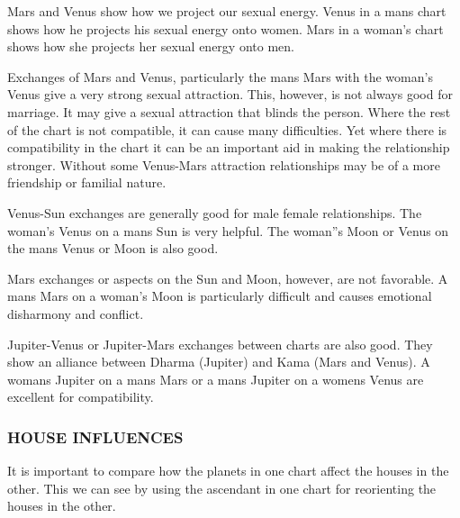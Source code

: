  


 

Mars and Venus show how we project our sexual energy. Venus in a mans chart shows how he projects his sexual energy onto women. Mars in a woman’s chart shows how she projects her sexual energy onto men.

 

Exchanges of Mars and Venus, particularly the mans Mars with the woman’s Venus give a very strong sexual attraction. This, however, is not always good for marriage. It may give a sexual attraction that blinds the person. Where the rest of the chart is not compatible, it can cause many difficulties. Yet where there is compatibility in the chart it can be an important aid in making the relationship stronger. Without some Venus-Mars attraction relationships may be of a more friendship or familial nature.

 



Venus-Sun exchanges are generally good for male female relationships. The woman’s Venus on a mans Sun is very helpful. The woman”s Moon or Venus on the mans Venus or Moon is also good.

 



Mars exchanges or aspects on the Sun and Moon, however, are not favorable. A mans Mars on a woman’s Moon is particularly difficult and causes emotional disharmony and conflict.

 



Jupiter-Venus or Jupiter-Mars exchanges between charts are also good. They show an alliance between Dharma (Jupiter) and Kama (Mars and Venus). A womans Jupiter on a mans Mars or a mans Jupiter on a womens Venus are excellent for compatibility.

 

 


\subsubsection{HOUSE INFLUENCES}

 

It is important to compare how the planets in one chart affect the houses in the other. This we can see by using the ascendant in one chart for reorienting the houses in the other.

